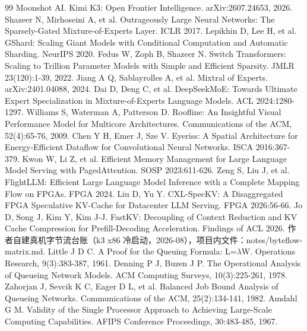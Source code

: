 \documentclass[11pt]{ctexart}
\begin{document}
\begin{thebibliography}{99}
 Moonshot AI. Kimi K3: Open Frontier Intelligence. arXiv:2607.24653, 2026.
 Shazeer N, Mirhoseini A, et al. Outrageously Large Neural Networks: The Sparsely-Gated Mixture-of-Experts Layer. ICLR 2017.
 Lepikhin D, Lee H, et al. GShard: Scaling Giant Models with Conditional Computation and Automatic Sharding. NeurIPS 2020.
 Fedus W, Zoph B, Shazeer N. Switch Transformers: Scaling to Trillion Parameter Models with Simple and Efficient Sparsity. JMLR 23(120):1-39, 2022.
 Jiang A Q, Sablayrolles A, et al. Mixtral of Experts. arXiv:2401.04088, 2024.
 Dai D, Deng C, et al. DeepSeekMoE: Towards Ultimate Expert Specialization in Mixture-of-Experts Language Models. ACL 2024:1280-1297.
 Williams S, Waterman A, Patterson D. Roofline: An Insightful Visual Performance Model for Multicore Architectures. Communications of the ACM, 52(4):65-76, 2009.
 Chen Y H, Emer J, Sze V. Eyeriss: A Spatial Architecture for Energy-Efficient Dataflow for Convolutional Neural Networks. ISCA 2016:367-379.
 Kwon W, Li Z, et al. Efficient Memory Management for Large Language Model Serving with PagedAttention. SOSP 2023:611-626.
 Zeng S, Liu J, et al. FlightLLM: Efficient Large Language Model Inference with a Complete Mapping Flow on FPGAs. FPGA 2024.
 Liu D, Yu Y. CXL-SpecKV: A Disaggregated FPGA Speculative KV-Cache for Datacenter LLM Serving. FPGA 2026:56-66.
 Jo D, Song J, Kim Y, Kim J-J. FastKV: Decoupling of Context Reduction and KV Cache Compression for Prefill-Decoding Acceleration. Findings of ACL 2026.
 作者自建真机字节流台账（k3 x86 冷启动，2026-08），项目内文件：notes/byteflow-matrix.md.
 Little J D C. A Proof for the Queuing Formula: L=$\lambda$W. Operations Research, 9(3):383-387, 1961.
 Denning P J, Buzen J P. The Operational Analysis of Queueing Network Models. ACM Computing Surveys, 10(3):225-261, 1978.
 Zahorjan J, Sevcik K C, Eager D L, et al. Balanced Job Bound Analysis of Queueing Networks. Communications of the ACM, 25(2):134-141, 1982.
 Amdahl G M. Validity of the Single Processor Approach to Achieving Large-Scale Computing Capabilities. AFIPS Conference Proceedings, 30:483-485, 1967.
\end{thebibliography}
\end{document}
